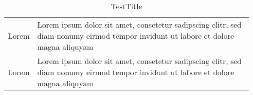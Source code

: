 
\begin{table}[!htbp]



\begin{tabularx}{\textwidth}{l>{\hsize=1.00\hsize}X}
\toprule
\toprule

Lorem
&

Lorem ipsum dolor sit amet, consetetur sadipscing elitr, sed diam nonumy eirmod tempor invidunt ut labore et dolore magna aliquyam
\\

Lorem
&

Lorem ipsum dolor sit amet, consetetur sadipscing elitr, sed diam nonumy eirmod tempor invidunt ut labore et dolore magna aliquyam
\\
\bottomrule
\end{tabularx}
\caption{TestTitle}
\end{table}
